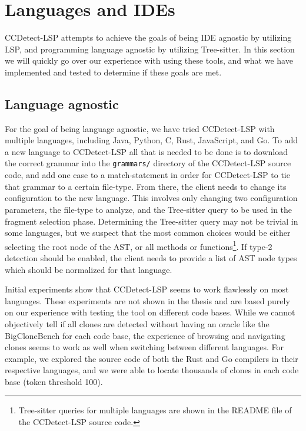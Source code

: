 \section{Languages and IDEs}

CCDetect-LSP attempts to achieve the goals of being IDE agnostic by utilizing LSP, and
programming language agnostic by utilizing Tree-sitter. In this section we will quickly go
over our experience with using these tools, and what we have implemented and tested to
determine if these goals are met.

\subsection*{Language agnostic}

For the goal of being language agnostic, we have tried CCDetect-LSP with multiple
languages, including Java, Python, C, Rust, JavaScript, and Go. To add a new language to
CCDetect-LSP all that is needed to be done is to download the correct grammar into the
\verb|grammars/| directory of the CCDetect-LSP source code, and add one case to a
match-statement in order for CCDetect-LSP to tie that grammar to a certain file-type. From
there, the client needs to change its configuration to the new language. This involves
only changing two configuration parameters, the file-type to analyze, and the Tree-sitter
query to be used in the fragment selection phase. Determining the Tree-sitter query may
not be trivial in some languages, but we suspect that the most common choices would be
either selecting the root node of the AST, or all methods or
functions\footnote{Tree-sitter queries for multiple languages are shown in the README file
of the CCDetect-LSP source code.}. If type-2 detection should be enabled, the client needs
to provide a list of AST node types which should be normalized for that language.

Initial experiments show that CCDetect-LSP seems to work flawlessly on most languages.
These experiments are not shown in the thesis and are based purely on our experience with
testing the tool on different code bases. While we cannot objectively tell if all clones
are detected without having an oracle like the BigCloneBench for each code base, the
experience of browsing and navigating clones seems to work as well when switching between
different languages. For example, we explored the source code of both the Rust and Go
compilers in their respective languages, and we were able to locate thousands of clones in
each code base (token threshold 100).

